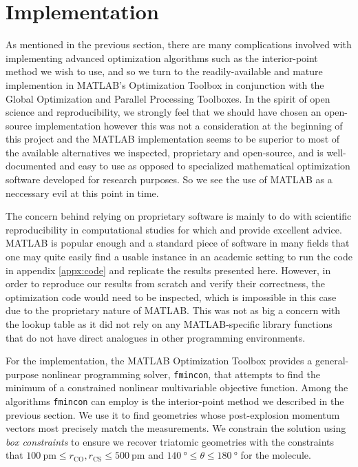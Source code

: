 \section{Implementation}
As mentioned in the previous section, there are many complications involved with implementing advanced optimization algorithms such as the interior-point method we wish to use, and so we turn to the readily-available and mature implemention in MATLAB's Optimization Toolbox in conjunction with the Global Optimization and Parallel Processing Toolboxes. In the spirit of open science and reproducibility, we strongly feel that we should have chosen an open-source implementation however this was not a consideration at the beginning of this project and the MATLAB implementation seems to be superior to most of the available alternatives we inspected, proprietary and open-source, and is well-documented and easy to use as opposed to specialized mathematical optimization software developed for research purposes. So we see the use of MATLAB as a neccessary evil at this point in time.

The concern behind relying on proprietary software is mainly to do with scientific reproducibility in computational studies \citep{Easterbrook14} for which \citet{Millman14} and \citet{Wilson14} provide excellent advice. MATLAB is popular enough and a standard piece of software in many fields that one may quite easily find a usable instance in an academic setting to run the code in appendix \ref{appx:code} and replicate the results presented here. However, in order to reproduce our results from scratch and verify their correctness, the optimization code would need to be inspected, which is impossible in this case due to the proprietary nature of MATLAB. This was not as big a concern with the lookup table as it did not rely on any MATLAB-specific library functions that do not have direct analogues in other programming environments.

For the implementation, the MATLAB Optimization Toolbox provides a general-purpose nonlinear programming solver, \texttt{fmincon}, that attempts to find the minimum of a constrained nonlinear multivariable objective function. Among the algorithms \texttt{fmincon} can employ is the interior-point method we described in the previous section. We use it to find geometries whose post-explosion momentum vectors most precisely match the measurements. We constrain the solution using \emph{box constraints} to ensure we recover triatomic geometries with the constraints that $\SI{100}{\pico\meter} \le r_\mathrm{CO}, r_\mathrm{CS} \le \SI{500}{\pico\meter}$ and $\SI{140}{\degree} \le \theta \le \SI{180}{\degree}$ for the  molecule.


